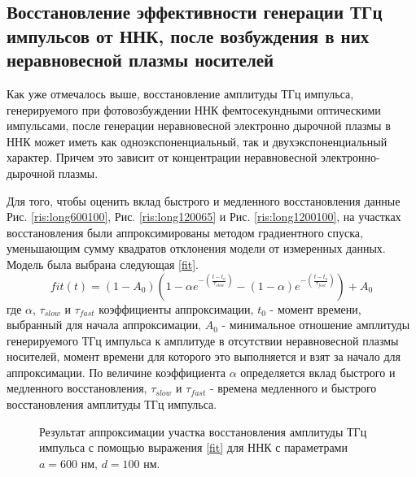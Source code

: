 \documentclass[a4paper,14pt,russian]{extreport}
\begin{document}
			\subsection{Восстановление эффективности генерации ТГц импульсов от ННК, после возбуждения в них неравновесной плазмы носителей}\label{paragraph:Recovery}
				Как уже отмечалось выше, восстановление амплитуды ТГц импульса, генерируемого при фотовозбуждении ННК фемтосекундными оптическими импульсами, после генерации неравновесной электронно дырочной плазмы в ННК может иметь как одноэкспоненциальный, так и двухэкспоненциальный характер. Причем это зависит от концентрации неравновесной электронно-дырочной плазмы.\par
				Для того, чтобы оценить вклад быстрого и медленного восстановления данные Рис. \ref{ris:long600100}, Рис. \ref{ris:long120065} и Рис. \ref{ris:long1200100}, на участках восстановления были аппроксимированы методом градиентного спуска, уменьшающим сумму квадратов отклонения модели от измеренных данных. Модель была выбрана следующая \ref{fit}.
				\begin{equation}\label{fit}
					fit(t) = (1-A_0)\left(1-\alpha e^{- \left(\frac{t - t_o}{\tau_{slow}}\right)} - (1-\alpha)e^{- \left(\frac{t - t_o}{\tau_{fast}}\right)}\right) + A_0
				\end{equation}
					где $\alpha$, $\tau_{slow}$ и $\tau_{fast}$ коэффициенты аппроксимации, $t_0$ - момент времени, выбранный для начала аппроксимации, $A_0$ - минимальное отношение амплитуды генерируемого ТГц импульса к амплитуде в отсутствии неравновесной плазмы носителей, момент времени для которого это выполняется и взят за начало для аппроксимации. По величине коэффициента $\alpha$ определяется вклад быстрого и медленного восстановления, $\tau_{slow}$ и $\tau_{fast}$ - времена медленного и быстрого восстановления амплитуды ТГц импульса.\par
				\begin{figure}[h]
					\caption{Результат аппроксимации участка восстановления амплитуды ТГц импульса с помощью выражения \ref{fit} для ННК с параметрами $a = 600 \text{ нм, } d = 100 \text{ нм}$.}
				\label{ris:LongAproximation600100}
				\end{figure}
\end{document}
